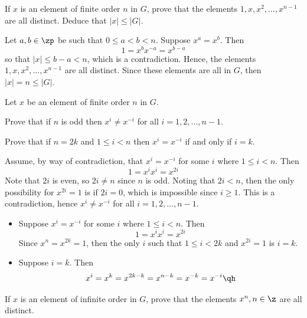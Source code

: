 \begin{exercise} \label{ex1.1.32}
    If $x$ is an element of finite order $n$ in $G$, prove that the elements $1, x, x^2, \dots, x^{n-1}$ are all distinct. Deduce that $|x| \leq |G|$.
\end{exercise}

\begin{sol}
    Let $a, b \in \zp$ be such that $0 \leq a < b < n$. Suppose $x^a = x^b$. Then
    \[1 = x^b x^{-a} = x^{b - a}\]
    so that $|x| \leq b - a < n$, which is a contradiction. Hence, the elements $1, x, x^2, \dots, x^{n-1}$ are all distinct. Since these elements are all in $G$, then $|x| = n \leq |G|$.
\end{sol}

\begin{exercise} \label{ex1.1.33}
    Let $x$ be an element of finite order $n$ in $G$.
    \begin{subproblems}
        \item Prove that if $n$ is odd then $x^i \neq x^{-i}$ for all $i = 1, 2, \dots, n-1$.
        \item Prove that if $n = 2k$ and $1 \leq i < n$ then $x^i = x^{-i}$ if and only if $i = k$.
    \end{subproblems}
\end{exercise}

\begin{solalph}
    \item Assume, by way of contradiction, that $x^i = x^{-i}$ for some $i$ where $1 \leq i < n$. Then
    \[1 = x^i x^i = x^{2i}\]
    Note that $2i$ is even, so $2i \neq n$ since $n$ is odd. Noting that $2i < n$, then the only possibility for $x^{2i} = 1$ is if $2i = 0$, which is impossible since $i \geq 1$. This is a contradiction, hence $x^i \neq x^{-i}$ for all $i = 1, 2, \dots, n-1$.
    \item
    \begin{itemize}
        \item [\rightimp] Suppose $x^i = x^{-i}$ for some $i$ where $1 \leq i < n$. Then
        \[1 = x^i x^i = x^{2i}\]
        Since $x^n = x^{2k} = 1$, then the only $i$ such that $1 \leq i < 2k$ and $x^{2i} = 1$ is $i = k$.
        \item [\leftimp] Suppose $i = k$. Then
        \[x^i = x^k = x^{2k - k} = x^{n - k} = x^{-k} = x^{-i} \qh\]
    \end{itemize}
\end{solalph}

\begin{exercise}\label{ex1.1.34}
    If $x$ is an element of infinite order in $G$, prove that the elements $x^n, n \in \z$ are all distinct.
\end{exercise}

